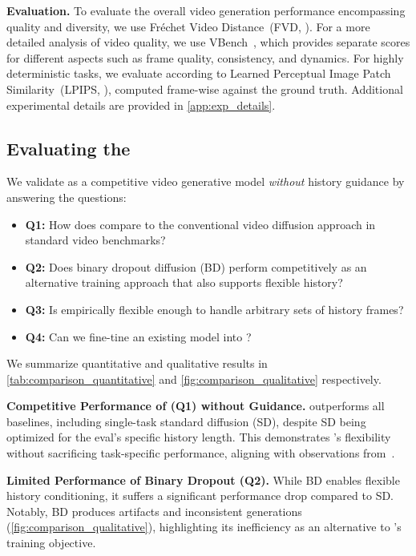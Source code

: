 \textbf{Evaluation.}  To evaluate the overall video generation performance encompassing quality and diversity, we use Fr\'echet Video Distance~(FVD, \citet{unterthiner2018towards}). For a more detailed analysis of video quality, we use VBench~\cite{huang2024vbench}, which provides separate scores for different aspects such as frame quality, consistency, and dynamics. For highly deterministic tasks, we evaluate according to Learned Perceptual Image Patch Similarity~(LPIPS, \citet{zhang2018unreasonable}), computed frame-wise against the ground truth. Additional experimental details are provided in \cref{app:exp_details}.

\subsection{Evaluating the \method}
\label{sec:exp_ablation}
We validate \mtd as a competitive video generative model \emph{without} history guidance by answering the questions:
\begin{itemize}[noitemsep,leftmargin=*,topsep=0em]
    \item \textbf{Q1:} How does \mtd compare to the conventional video diffusion approach in standard video benchmarks?
    \item \textbf{Q2:} Does binary dropout diffusion (BD) perform competitively as an alternative training approach that also supports flexible history?
    \item \textbf{Q3:} Is \mtd empirically flexible enough to handle arbitrary sets of history frames?
    \item \textbf{Q4:} Can we fine-tine an existing model into \mtd?
\end{itemize}

We summarize quantitative and qualitative results in \cref{tab:comparison_quantitative} and \cref{fig:comparison_qualitative} respectively.

\textbf{Competitive Performance of \mtd (Q1) without Guidance.} 
\mtd outperforms all baselines, including single-task standard diffusion (SD), despite SD being optimized for the eval's specific history length. This demonstrates \mtd's flexibility without sacrificing task-specific performance, aligning with observations from~\cite{chen2024diffusion}.


\textbf{Limited Performance of Binary Dropout (Q2).} 
While BD enables flexible history conditioning, it suffers a significant performance drop compared to SD. Notably, BD produces artifacts and inconsistent generations (\cref{fig:comparison_qualitative}), highlighting its inefficiency as an alternative to \mtd’s training objective. 

